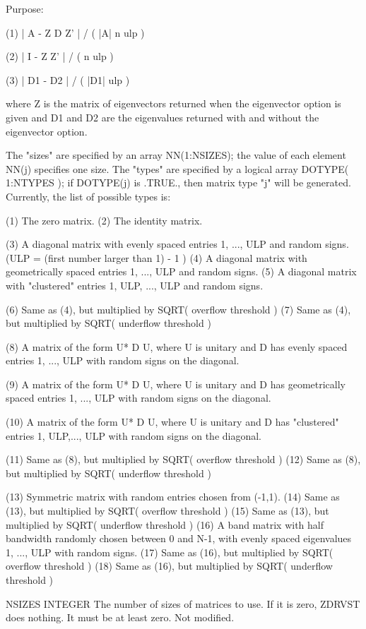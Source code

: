 \begin{DoxyParagraph}{Purpose\+: }
\begin{DoxyVerb}
      (1)     | A - Z D Z' | / ( |A| n ulp )

      (2)     | I - Z Z' | / ( n ulp )

      (3)     | D1 - D2 | / ( |D1| ulp )

      where Z is the matrix of eigenvectors returned when the
      eigenvector option is given and D1 and D2 are the eigenvalues
      returned with and without the eigenvector option.

      The "sizes" are specified by an array NN(1:NSIZES); the value of
      each element NN(j) specifies one size.
      The "types" are specified by a logical array DOTYPE( 1:NTYPES );
      if DOTYPE(j) is .TRUE., then matrix type "j" will be generated.
      Currently, the list of possible types is:

      (1)  The zero matrix.
      (2)  The identity matrix.

      (3)  A diagonal matrix with evenly spaced entries
           1, ..., ULP  and random signs.
           (ULP = (first number larger than 1) - 1 )
      (4)  A diagonal matrix with geometrically spaced entries
           1, ..., ULP  and random signs.
      (5)  A diagonal matrix with "clustered" entries 1, ULP, ..., ULP
           and random signs.

      (6)  Same as (4), but multiplied by SQRT( overflow threshold )
      (7)  Same as (4), but multiplied by SQRT( underflow threshold )

      (8)  A matrix of the form  U* D U, where U is unitary and
           D has evenly spaced entries 1, ..., ULP with random signs
           on the diagonal.

      (9)  A matrix of the form  U* D U, where U is unitary and
           D has geometrically spaced entries 1, ..., ULP with random
           signs on the diagonal.

      (10) A matrix of the form  U* D U, where U is unitary and
           D has "clustered" entries 1, ULP,..., ULP with random
           signs on the diagonal.

      (11) Same as (8), but multiplied by SQRT( overflow threshold )
      (12) Same as (8), but multiplied by SQRT( underflow threshold )

      (13) Symmetric matrix with random entries chosen from (-1,1).
      (14) Same as (13), but multiplied by SQRT( overflow threshold )
      (15) Same as (13), but multiplied by SQRT( underflow threshold )
      (16) A band matrix with half bandwidth randomly chosen between
           0 and N-1, with evenly spaced eigenvalues 1, ..., ULP
           with random signs.
      (17) Same as (16), but multiplied by SQRT( overflow threshold )
      (18) Same as (16), but multiplied by SQRT( underflow threshold )\end{DoxyVerb}
 \begin{DoxyVerb}  NSIZES  INTEGER
          The number of sizes of matrices to use.  If it is zero,
          ZDRVST does nothing.  It must be at least zero.
          Not modified.


\end{DoxyVerb}
\end{DoxyParagraph}

